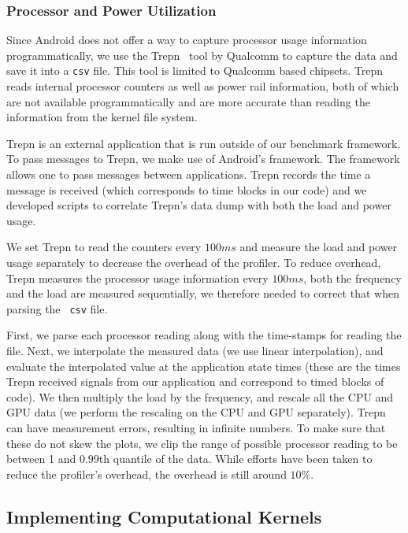 \subsubsection{Processor and Power Utilization}

Since Android does not offer a way to capture processor usage information
programmatically, we use the Trepn~\cite{profilerqualcomm} tool by Qualcomm to capture the data and save it into a {\tt csv} file.
This tool is limited to Qualcomm based
chipsets. Trepn reads internal processor counters as well as power rail information,
both of which are not available programmatically and are more accurate than reading
the information from the  kernel file system.

Trepn is an external application that is run outside of our benchmark framework.
To pass messages to Trepn, we make use of Android's  framework.
The  framework allows one to pass messages between applications.
Trepn records the time a message is received (which corresponds to time blocks
in our code) and we developed scripts to correlate Trepn's data dump with both
the load and power usage.

We set Trepn to read
the counters every $100ms$ and measure the load and power usage separately to
decrease the overhead of the profiler.  To reduce overhead, Trepn measures the
processor usage information every $100ms$, both the frequency and the load are
measured sequentially, we therefore needed to correct that when parsing the {\tt
csv} file.

First, we parse each processor reading along with the time-stamps for reading the
file.  Next, we interpolate the measured data (we use linear interpolation), and
evaluate the interpolated value at the application state times (these are the times
Trepn received signals from our application and correspond to timed blocks of
code).  We then multiply the load by the frequency, and rescale all the CPU and
GPU data (we perform the rescaling on the CPU and GPU separately).  Trepn can
have measurement errors, resulting in infinite numbers.  To make sure that these
do not skew the plots, we clip the range of possible processor reading to be
between 1 and $0.99$th quantile of the data.  While efforts have
been taken to reduce the profiler's overhead, the overhead is still around
$10\%$.


\subsection{Implementing Computational Kernels}
\label{sec:implementationRS}

